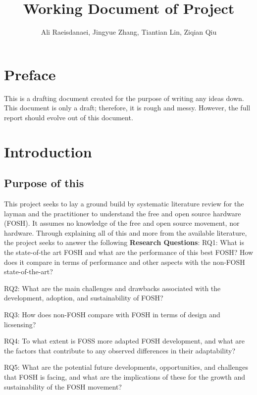 \documentclass{article}
\begin{document}


\title{Working Document of Project}
\author{Ali Raeisdanaei, Jingyue Zhang, Tiantian Lin, Ziqian Qiu }
\date{}
\maketitle

\section{Preface}
This is a drafting document created for the purpose of writing any ideas down.
This document is only a draft; therefore, it is rough and messy.
However, the full report should evolve out of this document.


\section{Introduction}

\subsection{Purpose of this}
This project seeks to lay a ground build by systematic literature review for the layman and the practitioner to understand the free and open source hardware (FOSH).
It assumes no knowledge of the free and open source movement, nor hardware.
Through explaining all of this and more from the available literature, the project seeks to answer the following \textbf{Research Questions}:
RQ1: What is the state-of-the art FOSH and what are the performance of this best FOSH? How does it compare in terms of performance and other aspects with the non-FOSH state-of-the-art? 

RQ2: What are the main challenges and drawbacks associated with the development, adoption, and sustainability of FOSH?

RQ3: How does non-FOSH compare with FOSH in terms of design and licsensing?

RQ4: To what extent is FOSS more adapted FOSH development, and what are the factors that contribute to any observed differences in their adaptability?

RQ5: What are the potential future developments, opportunities, and challenges that FOSH is facing, and what are the implications of these for the growth and sustainability of the FOSH movement?
\end{document}
